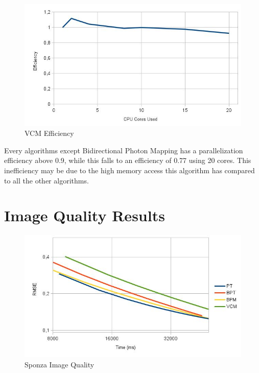 \begin{figure}[H]
\includegraphics[width=\linewidth]{img/vcmEff.jpg}
\caption{\label{img:vcmEff} VCM Efficiency}
\end{figure}

Every algorithms except Bidirectional Photon Mapping has a parallelization efficiency above 0.9, while this falls to an efficiency of 0.77 using 20 cores. This inefficiency may be due to the high memory access this algorithm has compared to all the other algorithms.

\section{Image Quality Results}

\begin{figure}[H]
\includegraphics[width=\linewidth]{img/sponzaImgq.jpg}
\caption{\label{img:sponzaImgq} Sponza Image Quality}
\end{figure}

